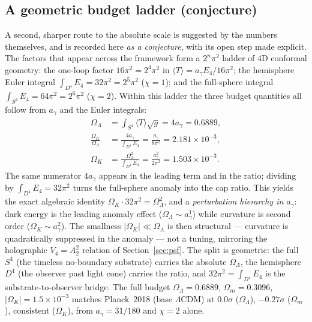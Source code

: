 \documentclass[11pt,a4paper]{article}
\theoremstyle{plain}
\theoremstyle{definition}
\theoremstyle{remark}
\newcommand{\Ok}{\Omega_K}
\newcommand{\OL}{\Omega_\Lambda}
\newcommand{\Om}{\Omega_m}
\newcommand{\ag}{a_\gamma}
\newcommand{\avg}[1]{\langle #1 \rangle}
\begin{document}
\subsection{A geometric budget ladder (conjecture)}
\label{sec:ladder}
A second, sharper route to the absolute scale is suggested by the numbers themselves, and is
recorded here \emph{as a conjecture}, with its open step made explicit. The factors that appear
across the framework form a $2^n\pi^2$ ladder of $4$D conformal geometry: the one-loop factor
$16\pi^2 = 2^4\pi^2$ in $\avg{T} = \ag E_4/16\pi^2$; the hemisphere Euler integral
$\int_{D^4}E_4 = 32\pi^2 = 2^5\pi^2$ ($\chi=1$); and the full-sphere integral
$\int_{S^4}E_4 = 64\pi^2 = 2^6\pi^2$ ($\chi=2$). Within this ladder the three budget quantities
all follow from $\ag$ and the Euler integrals:
\begin{align}
\OL &= \int_{S^4}\avg{T}\sqrt{g} = 4\ag = 0.6889 , \label{eq:ladder-ol}\\
\frac{\Ok}{\OL} &= \frac{4\ag}{\int_{D^4}E_4} = \frac{\ag}{8\pi^2} = 2.181\times10^{-3} ,\\
\Ok &= \frac{\OL^2}{\int_{D^4}E_4} = \frac{\ag^2}{2\pi^2} = 1.503\times10^{-3} .
\end{align}
The same numerator $4\ag$ appears in the leading term and in the ratio; dividing by
$\int_{D^4}E_4 = 32\pi^2$ turns the full-sphere anomaly into the cap ratio. This yields the exact
algebraic identity $\Ok\cdot 32\pi^2 = \OL^2$, and a \emph{perturbation hierarchy in $\ag$}:
dark energy is the leading anomaly effect ($\OL\sim\ag^1$) while curvature is second order
($\Ok\sim\ag^2$). The smallness $|\Ok|\ll\OL$ is then structural --- curvature is quadratically
suppressed in the anomaly --- not a tuning, mirroring the holographic $V_4 = A_2^2$ relation of
Section~\ref{sec:psf}. The split is geometric: the full $S^4$ (the timeless no-boundary
substrate) carries the absolute $\OL$, the hemisphere $D^4$ (the observer past light cone)
carries the ratio, and $32\pi^2 = \int_{D^4}E_4$ is the substrate-to-observer bridge. The full
budget $\OL = 0.6889$, $\Om = 0.3096$, $|\Ok| = 1.5\times10^{-3}$ matches Planck~2018 (base
$\Lambda$CDM) at $0.0\sigma$ ($\OL$), $-0.27\sigma$ ($\Om$), consistent ($\Ok$), from
$\ag = 31/180$ and $\chi=2$ alone.
\end{document}
